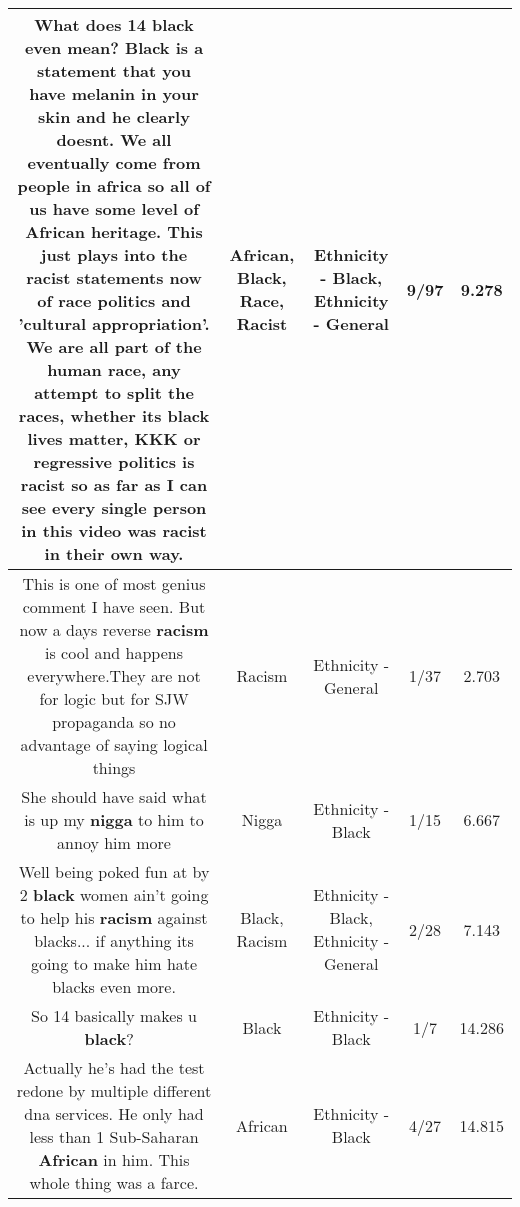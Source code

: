 \documentclass[11pt]{article}
\newlength\mylength
\begin{document}
\begin{center}
\begin{longtable}{|C{.65\mylength}|C{.30\mylength}|C{.12\mylength}|C{.12\mylength}|C{.12\mylength}|}
  \small What does 14 \textbf{black} even mean?  \textbf{Black} is a statement that you have melanin in your skin and he clearly doesnt.  We all eventually come from people in africa so all of us have some level of \textbf{African} heritage.  This just plays into the \textbf{racist} statements  now of \textbf{race} politics and 'cultural appropriation'.  We are all part of the human \textbf{race}, any attempt to split the races, whether its \textbf{black} lives matter, KKK or regressive politics is \textbf{racist} so as far as I can see every single person in this video was \textbf{racist} in their own way.\normalsize   & African, Black, Race, Racist & Ethnicity - Black, Ethnicity - General & 9/97 & 9.278 \\  \hline
  \small This is one of most genius comment I have seen. But now a days reverse \textbf{racism} is cool and happens everywhere.They are not for logic but for SJW propaganda so no advantage of saying logical things\normalsize   & Racism & Ethnicity - General & 1/37 & 2.703 \\  \hline
  \small She should have said what is up my \textbf{nigga} to him to annoy him more\normalsize   & Nigga & Ethnicity - Black & 1/15 & 6.667 \\  \hline
  \small Well being poked fun at by 2 \textbf{black} women ain't going to help his \textbf{racism} against blacks... if anything its going to make him hate blacks even more.\normalsize   & Black, Racism & Ethnicity - Black, Ethnicity - General & 2/28 & 7.143 \\  \hline
  \small So 14 basically makes u \textbf{black}? 🤔\normalsize   & Black & Ethnicity - Black & 1/7 & 14.286 \\  \hline
  \small Actually he's had the test redone by multiple different dna services. He only had less than 1 Sub-Saharan \textbf{African} in him. This whole thing was a farce.\normalsize   & African & Ethnicity - Black & 4/27 & 14.815 \\  \hline

\end{longtable}
\end{center}
\end{document}

